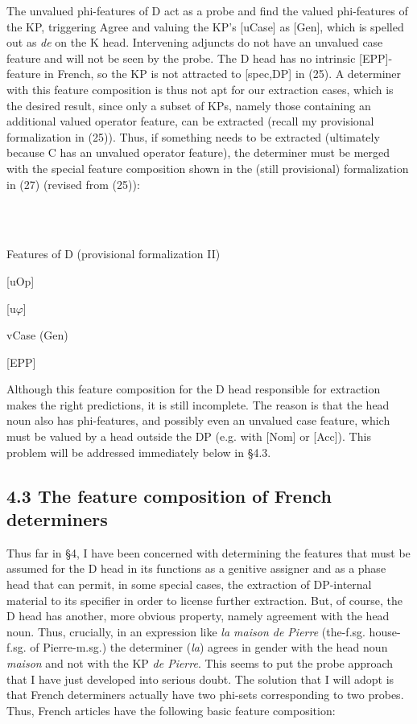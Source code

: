 \documentclass[output=paper]{langsci/langscibook}
\begin{document}
The unvalued phi-features of D act as a probe and find the valued phi-features of the KP, triggering Agree and valuing the KP’s [uCase] as [Gen], which is spelled out as \textit{de} on the K head. Intervening adjuncts do not have an unvalued case feature and will not be seen by the probe. The D head has no intrinsic [EPP]-feature in French, so the KP is not attracted to [spec,DP] in (25). A determiner with this feature composition is thus not apt for our extraction cases, which is the desired result, since only a subset of KPs, namely those containing an additional valued operator feature, can be extracted (recall my provisional formalization in (25)). Thus, if something needs to be extracted (ultimately because C has an unvalued operator feature), the determiner must be merged with the special feature composition shown in the (still provisional) formalization in (27) (revised from (25)): 

\ea%
    \label{ex:key:27}
    \gll\\
        \\
    \glt
    \z

            Features of D (provisional formalization II)

    [uOp]

    [u$\varphi $]  

         vCase (Gen)

       {\textbar}

    [EPP]

Although this feature composition for the D head responsible for extraction makes the right predictions, it is still incomplete. The reason is that the head noun also has phi-features, and possibly even an unvalued case feature, which must be valued by a head outside the DP (e.g. with [Nom] or [Acc]). This problem will be addressed immediately below in §4.3. 

\subsection{ 4.3  The feature composition of French determiners}

Thus far in §4, I have been concerned with determining the features that must be assumed for the D head in its functions as a genitive assigner and as a phase head that can permit, in some special cases, the extraction of DP-internal material to its specifier in order to license further extraction. But, of course, the D head has another, more obvious property, namely agreement with the head noun. Thus, crucially, in an expression like \textit{la maison de Pierre} (the-f.sg. house-f.sg. of Pierre-m.sg.) the determiner (\textit{la}) agrees in gender with the head noun \textit{maison} and not with the KP \textit{de Pierre}. This seems to put the probe approach that I have just developed into serious doubt. The solution that I will adopt is that French determiners actually have two phi-sets corresponding to two probes. Thus, French articles have the following basic feature composition:
\end{document}

